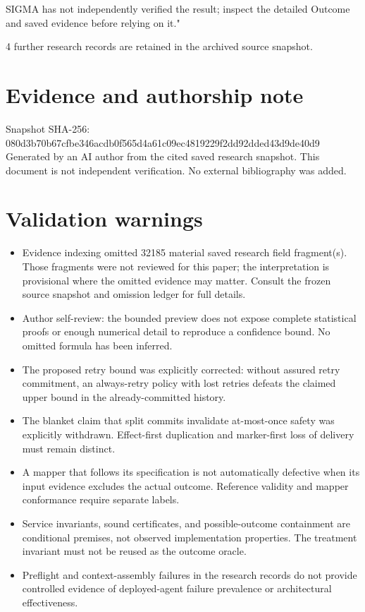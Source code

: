 \documentclass[11pt]{article}
\begin{document}
SIGMA has not independently verified the result; inspect the detailed Outcome and saved evidence before relying on it."

4 further research records are retained in the archived source snapshot.
\section*{Evidence and authorship note}
Snapshot SHA-256: 080d3b70b67cfbe346acdb0f565d4a61c09ec4819229f2dd92dded43d9de40d9
Generated by an AI author from the cited saved research snapshot. This document is not independent verification. No external bibliography was added.
\section*{Validation warnings}
\begin{itemize}
\item Evidence indexing omitted 32185 material saved research field fragment(s). Those fragments were not reviewed for this paper; the interpretation is provisional where the omitted evidence may matter. Consult the frozen source snapshot and omission ledger for full details.
\item Author self-review: the bounded preview does not expose complete statistical proofs or enough numerical detail to reproduce a confidence bound. No omitted formula has been inferred.
\item The proposed retry bound was explicitly corrected: without assured retry commitment, an always-retry policy with lost retries defeats the claimed upper bound in the already-committed history.
\item The blanket claim that split commits invalidate at-most-once safety was explicitly withdrawn. Effect-first duplication and marker-first loss of delivery must remain distinct.
\item A mapper that follows its specification is not automatically defective when its input evidence excludes the actual outcome. Reference validity and mapper conformance require separate labels.
\item Service invariants, sound certificates, and possible-outcome containment are conditional premises, not observed implementation properties. The treatment invariant must not be reused as the outcome oracle.
\item Preflight and context-assembly failures in the research records do not provide controlled evidence of deployed-agent failure prevalence or architectural effectiveness.

\end{itemize}
\end{document}
